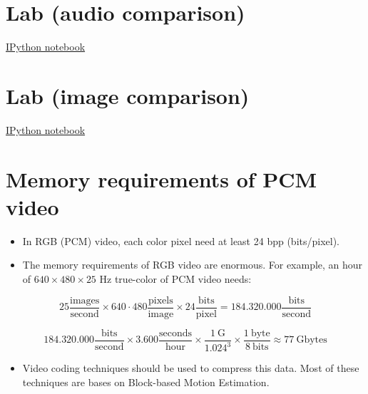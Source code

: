 \section{Lab (audio comparison)}
\href{https://nbviewer.jupyter.org/github/vicente-gonzalez-ruiz/why_to_compress/blob/master/lab1.ipynb}{IPython notebook}

\section{Lab (image comparison)}
\href{https://nbviewer.jupyter.org/github/vicente-gonzalez-ruiz/why_to_compress/blob/master/lab2.ipynb}{IPython notebook}

\section{Memory requirements of PCM video}

\begin{itemize}
\item In RGB (PCM) video, each color pixel need at least 24 bpp
  (bits/pixel).
\item The memory requirements of RGB video are enormous. For example,
  an hour of \(640\times 480\times 25\) Hz true-color of PCM video
  needs:
\end{itemize}

\begin{equation}
  25\frac{\text{images}}{\text{second}}\times 640\cdot
  480\frac{\text{pixels}}{\text{image}}\times
  24\frac{\text{bits}}{\text{pixel}}=
  184{.}320{.}000\frac{\text{bits}}{\text{second}}
\end{equation}

\begin{equation}
  184{.}320{.}000\frac{\text{bits}}{\text{second}} \times
  3{.}600\frac{\text{seconds}}{\text{hour}} \times
  \frac{1~\text{G}}{1{.}024^3}\times
  \frac{1~\text{byte}}{8~\text{bits}} \approx 77~\text{Gbytes}
\end{equation}

\begin{itemize}
\item Video coding techniques should be used to compress this data. Most of these techniques are bases on Block-based Motion Estimation.
\end{itemize}

